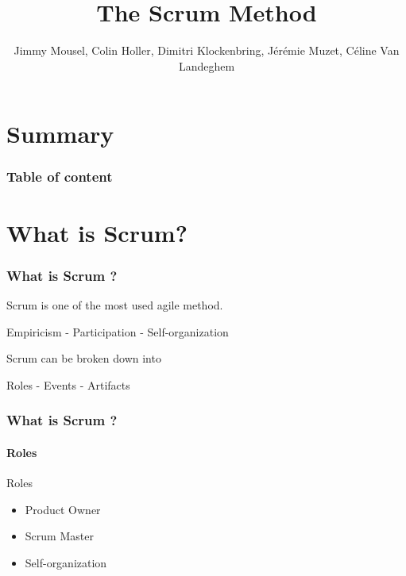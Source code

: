 \documentclass{beamer}
\title{The Scrum Method}
\author{Jimmy Mousel, Colin Holler, Dimitri Klockenbring, Jérémie Muzet, Céline Van Landeghem}
\date{}
\begin{document}
\frame{\titlepage}



\section{Summary}

\begin{frame}
    \frametitle{Table of content}
    \tableofcontents
\end{frame}



\section{What is Scrum?}

\begin{frame}
    \frametitle{What is Scrum ?}
    \begin{block}
         Scrum is one of the most used agile method.
        \begin{center}
             Empiricism  - Participation  - Self-organization
        \end{center}
    \end{block}
    \pause
    \begin{block}
         Scrum can be broken down into
        \begin{center}
             Roles  - Events  - Artifacts
        \end{center}
    \end{block}
\end{frame}

\begin{frame}
    \frametitle{What is Scrum ?}
    
    \framesubtitle{Roles}
    
    \begin{block}{Roles}
        \begin{itemize}
            \item Product Owner
            
            \item Scrum Master
            
            \item Self-organization
        \end{itemize}
    \end{block}
\end{frame}
\end{document}

